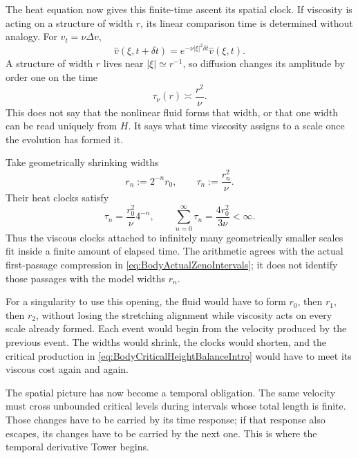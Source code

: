 The heat equation now gives this finite-time ascent its spatial clock.  If
viscosity is acting on a structure of width \(r\), its linear comparison time
is determined without analogy.  For \(v_t=\nu\Delta v\),
\[
  \widehat v(\xi,t+\delta t)
  =e^{-\nu|\xi|^2\delta t}\widehat v(\xi,t).
\]
A structure of width \(r\) lives near \(|\xi|\simeq r^{-1}\), so diffusion
changes its amplitude by order one on the time
\begin{equation}\label{eq:BodyHeatComparisonTime}
  \tau_\nu(r)\asymp\frac{r^2}{\nu}.
\end{equation}
This does not say that the nonlinear fluid forms that width, or that one width
can be read uniquely from \(H\).  It says what time viscosity assigns to a
scale once the evolution has formed it.

Take geometrically shrinking widths
\[
  r_n:=2^{-n}r_0,
  \qquad
  \tau_n:=\frac{r_n^2}{\nu}.
\]
Their heat clocks satisfy
\begin{equation}\label{eq:BodyZenoHeatClock}
  \tau_n=\frac{r_0^2}{\nu}4^{-n},
  \qquad
  \sum_{n=0}^{\infty}\tau_n
  =\frac{4r_0^2}{3\nu}<\infty.
\end{equation}
Thus the viscous clocks attached to infinitely many geometrically smaller
scales fit inside a finite amount of elapsed time.  The arithmetic agrees with
the actual first-passage compression in
\eqref{eq:BodyActualZenoIntervals}; it does not identify those passages with
the model widths \(r_n\).

For a singularity to use this opening, the fluid would have to form
\(r_0\), then \(r_1\), then \(r_2\), without losing the stretching alignment
while viscosity acts on every scale already formed.  Each event would begin
from the velocity produced by the previous event.  The widths would shrink,
the clocks would shorten, and the critical production in
\eqref{eq:BodyCriticalHeightBalanceIntro} would have to meet its viscous cost
again and again.

The spatial picture has now become a temporal obligation.  The same velocity
must cross unbounded critical levels during intervals whose total length is
finite.  Those changes have to be carried by its time response; if that
response also escapes, its changes have to be carried by the next one.  This
is where the temporal derivative Tower begins.
